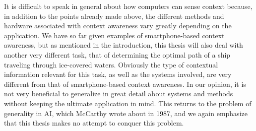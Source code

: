 It is difficult to speak in general about how computers can sense context because, in addition to the points already made above, the different methods and hardware associated with context awareness vary greatly depending on the application. We have so far given examples of smartphone-based context awareness, but as mentioned in the introduction, this thesis will also deal with another very different task, that of determining the optimal path of a ship traveling through ice-covered waters. Obviously the type of contextual information relevant for this task, as well as the systems involved, are very different from that of smartphone-based context awareness. In our opinion, it is not very beneficial to generalize in great detail about systems and methods without keeping the ultimate application in mind. This returns to the problem of generality in AI, which McCarthy wrote about in 1987, and we again emphasize that this thesis makes no attempt to conquer this problem.

